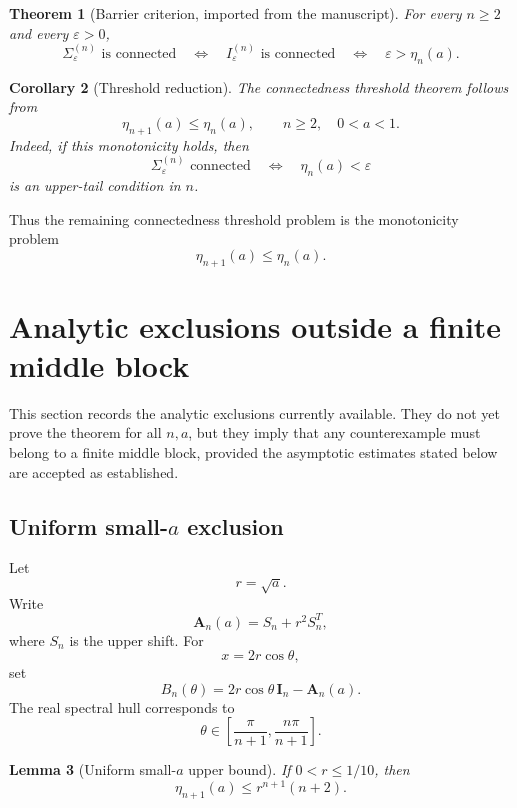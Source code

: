 \documentclass[11pt]{article}
\numberwithin{equation}{section}
\newtheorem{theorem}{Theorem}[section]
\newtheorem{lemma}[theorem]{Lemma}
\newtheorem{corollary}[theorem]{Corollary}
\begin{document}
\begin{theorem}[Barrier criterion, imported from the manuscript]
\label{thm:barrier}
For every \(n\ge2\) and every \(\varepsilon>0\),
\[
\Sigma_\varepsilon^{(n)}\text{ is connected}
\quad\Longleftrightarrow\quad
I_\varepsilon^{(n)}\text{ is connected}
\quad\Longleftrightarrow\quad
\varepsilon>\eta_n(a).
\]
\end{theorem}

\begin{corollary}[Threshold reduction]
\label{cor:threshold-reduction}
The connectedness threshold theorem follows from
\[
\eta_{n+1}(a)\le\eta_n(a),
\qquad n\ge2,\quad 0<a<1.
\]
Indeed, if this monotonicity holds, then
\[
\Sigma_\varepsilon^{(n)}\text{ connected}
\quad\Longleftrightarrow\quad
\eta_n(a)<\varepsilon
\]
is an upper-tail condition in \(n\).
\end{corollary}

Thus the remaining connectedness threshold problem is the monotonicity problem
\[
\boxed{
\eta_{n+1}(a)\le\eta_n(a).
}
\]

\section{Analytic exclusions outside a finite middle block}

This section records the analytic exclusions currently available. They do not yet
prove the theorem for all \(n,a\), but they imply that any counterexample must
belong to a finite middle block, provided the asymptotic estimates stated below are
accepted as established.

\subsection{\texorpdfstring{Uniform small-\(a\) exclusion}{Uniform small-a exclusion}}

Let
\[
r=\sqrt a.
\]
Write
\[
\mathbf A_n(a)=S_n+r^2S_n^T,
\]
where \(S_n\) is the upper shift. For
\[
x=2r\cos\theta,
\]
set
\[
B_n(\theta)=2r\cos\theta\,\mathbf I_n-\mathbf A_n(a).
\]
The real spectral hull corresponds to
\[
\theta\in\left[\frac{\pi}{n+1},\frac{n\pi}{n+1}\right].
\]

\begin{lemma}[Uniform small-\(a\) upper bound]
\label{lem:small-upper}
If \(0<r\le1/10\), then
\[
\eta_{n+1}(a)\le r^{n+1}(n+2).
\]
\end{lemma}
\end{document}
